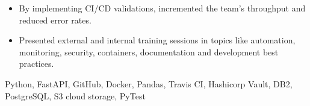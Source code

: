 \begin{experiences}
{\begin{itemize}
                \item By implementing CI/CD validations, incremented the team's throughput and
                    reduced error rates.
				\item Presented external and internal training sessions in 
                    topics like automation, monitoring, security, containers, documentation 
                    and development best practices.
            \end{itemize}
        }
        {
            Python,
            FastAPI,
            GitHub,
            Docker,
            Pandas,
            Travis CI,
            Hashicorp Vault,
            DB2,
            PostgreSQL,
            S3 cloud storage,
            PyTest
        }


\end{experiences}
